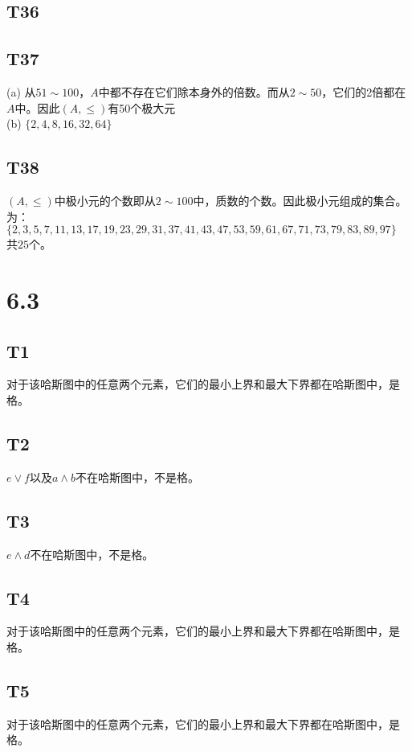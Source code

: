 \documentclass{article}
\begin{document}
\subsection{T36}
\subsection{T37}
(a) 从$51 \sim 100$，$A$中都不存在它们除本身外的倍数。而从$2 \sim 50$，它们的2倍都在$A$中。因此$(A, \leq)$有50个极大元\\
(b) $\{2, 4, 8, 16, 32, 64\}$
\subsection{T38}
$(A, \leq)$中极小元的个数即从$2 \sim 100$中，质数的个数。因此极小元组成的集合。\\
为：$\{2, 3, 5, 7, 11, 13, 17, 19, 23, 29, 31, 37, 41, 43, 47, 53, 59, 61, 67, 71, 73, 79, 83, 89, 97\}$
共$25$个。
\section{6.3}
\subsection{T1}
对于该哈斯图中的任意两个元素，它们的最小上界和最大下界都在哈斯图中，是格。
\subsection{T2}
$e \lor f$以及$a \land b$不在哈斯图中，不是格。
\subsection{T3}
$e \land d$不在哈斯图中，不是格。
\subsection{T4}
对于该哈斯图中的任意两个元素，它们的最小上界和最大下界都在哈斯图中，是格。
\subsection{T5}
对于该哈斯图中的任意两个元素，它们的最小上界和最大下界都在哈斯图中，是格。
\end{document}
